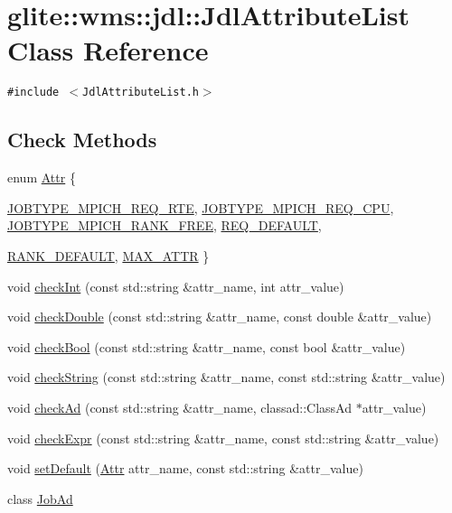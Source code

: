 \hypertarget{classglite_1_1wms_1_1jdl_1_1JdlAttributeList}{
\section{glite::wms::jdl::Jdl\-Attribute\-List Class Reference}
\label{classglite_1_1wms_1_1jdl_1_1JdlAttributeList}
}
{\tt \#include $<$Jdl\-Attribute\-List.h$>$}

\subsection*{Check Methods}
\begin{CompactItemize}
\item 
enum \hyperlink{classglite_1_1wms_1_1jdl_1_1JdlAttributeList_z25_0}{Attr} \{ \par
\hyperlink{classglite_1_1wms_1_1jdl_1_1JdlAttributeList_z25_0w0}{JOBTYPE\_\-MPICH\_\-REQ\_\-RTE}, 
\hyperlink{classglite_1_1wms_1_1jdl_1_1JdlAttributeList_z25_0w1}{JOBTYPE\_\-MPICH\_\-REQ\_\-CPU}, 
\hyperlink{classglite_1_1wms_1_1jdl_1_1JdlAttributeList_z25_0w2}{JOBTYPE\_\-MPICH\_\-RANK\_\-FREE}, 
\hyperlink{classglite_1_1wms_1_1jdl_1_1JdlAttributeList_z25_0w3}{REQ\_\-DEFAULT}, 
\par
\hyperlink{classglite_1_1wms_1_1jdl_1_1JdlAttributeList_z25_0w4}{RANK\_\-DEFAULT}, 
\hyperlink{classglite_1_1wms_1_1jdl_1_1JdlAttributeList_z25_0w5}{MAX\_\-ATTR}
 \}
\item 
void \hyperlink{classglite_1_1wms_1_1jdl_1_1JdlAttributeList_z25_1}{check\-Int} (const std::string \&attr\_\-name, int attr\_\-value)
\item 
void \hyperlink{classglite_1_1wms_1_1jdl_1_1JdlAttributeList_z25_2}{check\-Double} (const std::string \&attr\_\-name, const double \&attr\_\-value)
\item 
void \hyperlink{classglite_1_1wms_1_1jdl_1_1JdlAttributeList_z25_3}{check\-Bool} (const std::string \&attr\_\-name, const bool \&attr\_\-value)
\item 
void \hyperlink{classglite_1_1wms_1_1jdl_1_1JdlAttributeList_z25_4}{check\-String} (const std::string \&attr\_\-name, const std::string \&attr\_\-value)
\item 
void \hyperlink{classglite_1_1wms_1_1jdl_1_1JdlAttributeList_z25_5}{check\-Ad} (const std::string \&attr\_\-name, classad::Class\-Ad $\ast$attr\_\-value)
\item 
void \hyperlink{classglite_1_1wms_1_1jdl_1_1JdlAttributeList_z25_6}{check\-Expr} (const std::string \&attr\_\-name, const std::string \&attr\_\-value)
\item 
void \hyperlink{classglite_1_1wms_1_1jdl_1_1JdlAttributeList_z25_7}{set\-Default} (\hyperlink{classglite_1_1wms_1_1jdl_1_1JdlAttributeList_z25_0}{Attr} attr\_\-name, const std::string \&attr\_\-value)
\item 
class \hyperlink{classglite_1_1wms_1_1jdl_1_1JdlAttributeList_z25_17}{Job\-Ad}
\end{CompactItemize}
